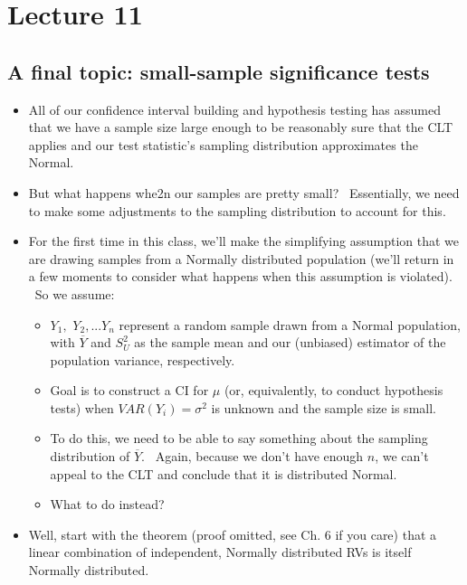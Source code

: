 \documentclass[11pt]{article}
\begin{document}
\section{Lecture 11}

\subsection{A final topic: small-sample significance tests}

\begin{itemize}
\item All of our confidence interval building and hypothesis testing has
assumed that we have a sample size large enough to be reasonably sure that
the CLT applies and our test statistic's sampling distribution approximates
the Normal.

\item But what happens whe2n our samples are pretty small? \ Essentially, we
need to make some adjustments to the sampling distribution to account for
this. \ 

\item For the first time in this class, we'll make the simplifying
assumption that we are drawing samples from a Normally distributed
population (we'll return in a few moments to consider what happens when this
assumption is violated). \ So we assume:

\begin{itemize}
\item $Y_{1},$ $Y_{2},...Y_{n}$ represent a random sample drawn from a
Normal population, with $\overline{Y}$ and $S_{U}^{2}$ as the sample mean
and our (unbiased) estimator of the population variance, respectively.

\item Goal is to construct a CI for $\mu $ (or, equivalently, to conduct
hypothesis tests) when $VAR(Y_{i})=\sigma ^{2}$ is unknown and the sample
size is small.

\item To do this, we need to be able to say something about the sampling
distribution of $\overline{Y}.$ \ Again, because we don't have enough $n$,
we can't appeal to the CLT and conclude that it is distributed Normal. \ 

\item What to do instead?
\end{itemize}

\item Well, start with the theorem (proof omitted, see Ch. 6 if you care)
that a linear combination of independent, Normally distributed RVs is itself
Normally distributed.


\end{itemize}
\end{document}

